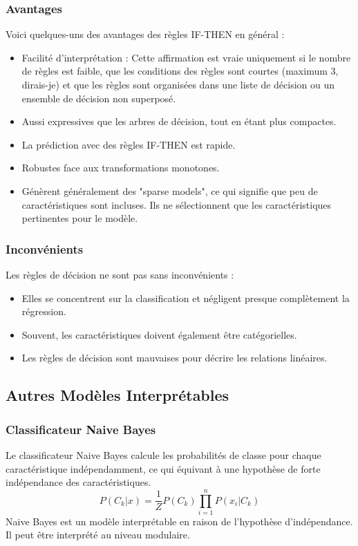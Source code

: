 \subsubsection{Avantages}
Voici quelques-uns des avantages des règles IF-THEN en général :
\begin{itemize}
    \item Facilité d'interprétation : Cette affirmation est vraie uniquement si le nombre de règles est faible, que les conditions des règles sont courtes (maximum 3, dirais-je) et que les règles sont organisées dans une liste de décision ou un ensemble de décision non superposé.
    \item Aussi expressives que les arbres de décision, tout en étant plus compactes.
    \item La prédiction avec des règles IF-THEN est rapide.
    \item Robustes face aux transformations monotones.
    \item Génèrent généralement des "sparse models", ce qui signifie que peu de caractéristiques sont incluses. Ils ne sélectionnent que les caractéristiques pertinentes pour le modèle.
\end{itemize}

\subsubsection{Inconvénients}
Les règles de décision ne sont pas sans inconvénients :
\begin{itemize}
    \item Elles se concentrent sur la classification et négligent presque complètement la régression.
    \item Souvent, les caractéristiques doivent également être catégorielles.
    \item Les règles de décision sont mauvaises pour décrire les relations linéaires.
\end{itemize}

\subsection{Autres Modèles Interprétables}

\subsubsection{Classificateur Naive Bayes}
Le classificateur Naive Bayes calcule les probabilités de classe pour chaque caractéristique indépendamment, ce qui équivant à une hypothèse de forte indépendance des caractéristiques.
\begin{equation}
P(C_k|x) = \frac{1}{Z} P(C_k) \prod_{i=1}^n P(x_i|C_k)
\end{equation}
Naive Bayes est un modèle interprétable en raison de l'hypothèse d'indépendance.
Il peut être interprété au niveau modulaire.

